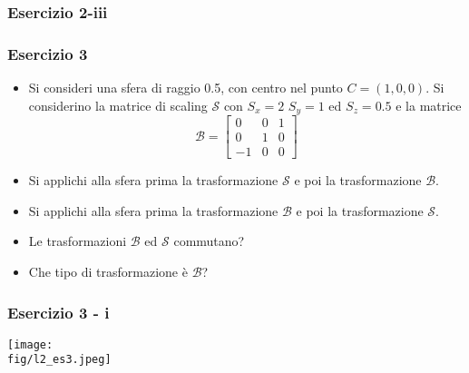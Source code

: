\documentclass{beamer}
\newcommand{\fig}{figures} %
\begin{document}
\begin{frame}
\frametitle{Esercizio 2-iii}
\begin{center}
\end{center}
\end{frame}
\begin{frame}
\frametitle{Esercizio 3}
\begin{itemize}
\item Si consideri una sfera di raggio 0.5, con centro nel punto $C=(1,0,0)$. Si
considerino la matrice di scaling $\mathcal{S}$ con $S_x=2$ $S_y=1$ ed $S_z =0.5$ e la matrice 
\begin{displaymath}
\mathcal{B} =  \begin{bmatrix}
                0 & 0 & 1\\
                0  & 1 & 0\\
                -1 & 0 & 0
                \end{bmatrix}
\end{displaymath}
\item Si applichi alla sfera prima la trasformazione $\mathcal{S}$ e poi la trasformazione $\mathcal{B}$.
\item Si applichi alla sfera prima la trasformazione $\mathcal{B}$ e poi la trasformazione $\mathcal{S}$.
\item Le trasformazioni $\mathcal{B}$ ed $\mathcal{S}$ commutano?
\item Che tipo di trasformazione \`e $\mathcal{B}$?
\end{itemize}
\end{frame}
\begin{frame}
\frametitle{Esercizio 3 - i}
\texttt{[image: \\fig/l2\_es3.jpeg]}
\end{frame}
%
\end{document}
